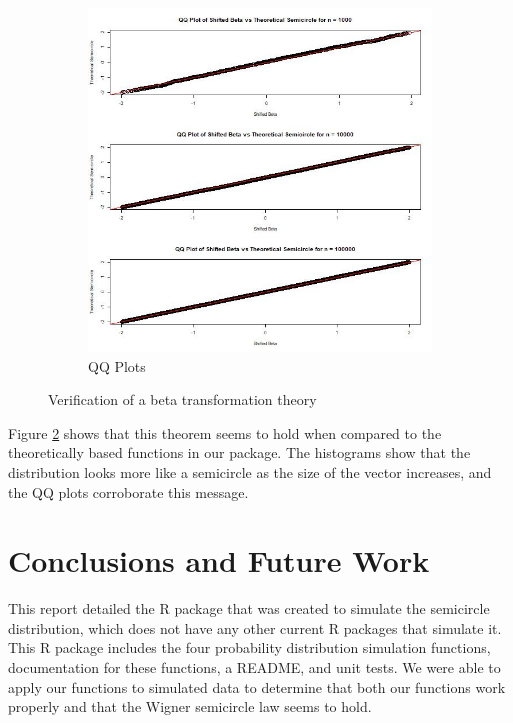 \documentclass[11pt]{asaproc}
\begin{document}
\begin{figure}[H]
\begin{subfigure}[b]{0.4\textwidth}
         \includegraphics[width=\textwidth]{figures/BetaTrans_QQ.jpeg}
         \caption{QQ Plots}
         \label{fig:betatrans_qq}
     \end{subfigure}
        \caption{Verification of a beta transformation theory}
        \label{fig:betatrans}
\end{figure}

Figure \ref{fig:betatrans} shows that this theorem seems to hold when compared to the theoretically based functions in our package. The histograms show that the distribution looks more like a semicircle as the size of the vector increases, and the QQ plots corroborate this message.


\section{Conclusions and Future Work}
\label{Conclusion}

This report detailed the R package that was created to simulate the semicircle distribution, which does not have any other current R packages that simulate it. This R package includes the four probability distribution simulation functions, documentation for these functions, a README, and unit tests. We were able to apply our functions to simulated data to determine that both our functions work properly and that the Wigner semicircle law seems to hold.
\end{document}

